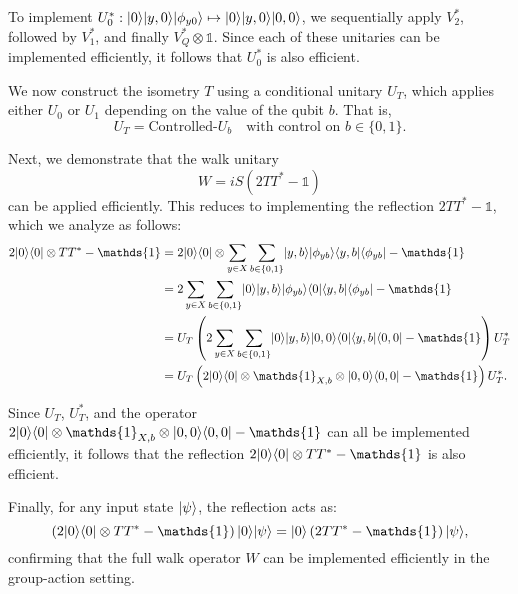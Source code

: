 \documentclass[12pt]{report}
\begin{document}
To implement \( U_0^* : \lvert0\rangle \lvert y, 0\rangle \lvert\phi_{y0}\rangle \mapsto \lvert0\rangle \lvert y, 0\rangle \lvert0, 0\rangle \), we sequentially apply \( V_2^* \), followed by \( V_1^* \), and finally \( V_Q^* \otimes \mathds{1} \). Since each of these unitaries can be implemented efficiently, it follows that \( U_0^* \) is also efficient.

We now construct the isometry \( T \) using a conditional unitary \( U_T \), which applies either \( U_0 \) or \( U_1 \) depending on the value of the qubit \( b \). That is,
\[
U_T = \text{Controlled-}U_b \quad \text{with control on } b \in \{0,1\}.
\]

Next, we demonstrate that the walk unitary
\[
W = iS(2TT^* - \mathds{1})
\]
can be applied efficiently. This reduces to implementing the reflection \( 2TT^* - \mathds{1} \), which we analyze as follows:
\begin{align*}
2\ket{0}\bra{0} \otimes TT^* - \mathds{1}
&= 2\ket{0}\bra{0} \otimes \sum_{y \in X} \sum_{b \in \{0,1\}} \ket{y,b} \ket{\phi_{yb}} \bra{y,b} \bra{\phi_{yb}} - \mathds{1} \\
&= 2\sum_{y \in X} \sum_{b \in \{0,1\}} \ket{0} \ket{y,b} \ket{\phi_{yb}} \bra{0} \bra{y,b} \bra{\phi_{yb}} - \mathds{1} \\
&= U_T \left( 2 \sum_{y \in X} \sum_{b \in \{0,1\}} \ket{0} \ket{y,b} \ket{0,0} \bra{0} \bra{y,b} \bra{0,0} - \mathds{1} \right) U_T^* \\
&= U_T \left( 2\ket{0}\bra{0} \otimes \mathds{1}_{X,b} \otimes \ket{0,0}\bra{0,0} - \mathds{1} \right) U_T^*.
\end{align*}

Since \( U_T \), \( U_T^* \), and the operator \( 2\ket{0}\bra{0} \otimes \mathds{1}_{X,b} \otimes \ket{0,0}\bra{0,0} - \mathds{1} \) can all be implemented efficiently, it follows that the reflection \( 2\ket{0}\bra{0} \otimes TT^* - \mathds{1} \) is also efficient.

Finally, for any input state \( \lvert\psi\rangle \), the reflection acts as:
\[
\left(2\ket{0}\bra{0} \otimes TT^* - \mathds{1} \right) \ket{0} \ket{\psi} = \ket{0} \left(2TT^* - \mathds{1} \right) \ket{\psi},
\]
confirming that the full walk operator \( W \) can be implemented efficiently in the group-action setting.





\end{document}

